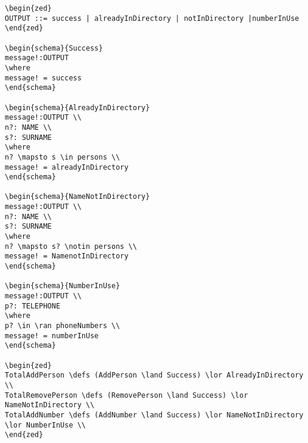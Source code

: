 \begin{verbatim}
\begin{zed}
OUTPUT ::= success | alreadyInDirectory | notInDirectory |numberInUse
\end{zed}

\begin{schema}{Success}
message!:OUTPUT
\where
message! = success
\end{schema}

\begin{schema}{AlreadyInDirectory}
message!:OUTPUT \\
n?: NAME \\
s?: SURNAME
\where
n? \mapsto s \in persons \\
message! = alreadyInDirectory
\end{schema}

\begin{schema}{NameNotInDirectory}
message!:OUTPUT \\
n?: NAME \\
s?: SURNAME
\where
n? \mapsto s? \notin persons \\
message! = NamenotInDirectory
\end{schema}

\begin{schema}{NumberInUse}
message!:OUTPUT \\
p?: TELEPHONE
\where
p? \in \ran phoneNumbers \\
message! = numberInUse
\end{schema}

\begin{zed}
TotalAddPerson \defs (AddPerson \land Success) \lor AlreadyInDirectory \\
TotalRemovePerson \defs (RemovePerson \land Success) \lor NameNotInDirectory \\
TotalAddNumber \defs (AddNumber \land Success) \lor NameNotInDirectory \lor NumberInUse \\
\end{zed}


\end{verbatim}